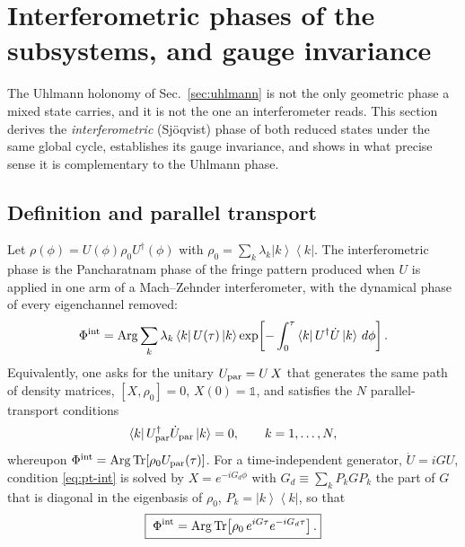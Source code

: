 \documentclass[11pt]{article}
\newcommand{\ket}[1]{\left|#1\right\rangle}
\newcommand{\bra}[1]{\left\langle#1\right|}
\newcommand{\Tr}{\operatorname{Tr}}
\newcommand{\Arg}{\operatorname{Arg}}
\begin{document}
\section{Interferometric phases of the subsystems, and gauge invariance}
\label{sec:interf}

The Uhlmann holonomy of Sec.~\ref{sec:uhlmann} is not the only geometric phase
a mixed state carries, and it is not the one an interferometer reads. This
section derives the \emph{interferometric} (Sj\"oqvist) phase
\cite{Sjoqvist2000} of both reduced states under the same global cycle,
establishes its gauge invariance, and shows in what precise sense it is
complementary to the Uhlmann phase.

\subsection{Definition and parallel transport}

Let $\rho(\phi)=U(\phi)\rho_0U^\dagger(\phi)$ with
$\rho_0=\sum_k\lambda_k\ket{k}\bra{k}$. The interferometric phase is the
Pancharatnam phase of the fringe pattern produced when $U$ is applied in one
arm of a Mach--Zehnder interferometer, with the dynamical phase of every
eigenchannel removed:
\begin{equation}
\Phi^{\rm int}=\Arg\sum_k\lambda_k\bra{k}U(\tau)\ket{k}
\exp\!\left[-\int_0^\tau\bra{k}U^\dagger\dot U\ket{k}\,d\phi\right].
\label{eq:sjoqvist}
\end{equation}
Equivalently, one asks for the unitary $U_{\rm par}=U\,X$ that generates the
same path of density matrices, $[X,\rho_0]=0$, $X(0)=\mathbb 1$, and satisfies
the $N$ parallel-transport conditions
\begin{equation}
\bra{k}U_{\rm par}^\dagger\dot U_{\rm par}\ket{k}=0,\qquad k=1,\dots,N ,
\label{eq:pt-int}
\end{equation}
whereupon $\Phi^{\rm int}=\Arg\Tr[\rho_0U_{\rm par}(\tau)]$. For a
time-independent generator, $\dot U=iGU$, condition \eqref{eq:pt-int} is solved
by $X=e^{-iG_d\phi}$ with $G_d\equiv\sum_kP_kGP_k$ the part of $G$ that is
diagonal in the eigenbasis of $\rho_0$, $P_k=\ket{k}\bra{k}$, so that
\begin{equation}
\boxed{\;\Phi^{\rm int}=\Arg\Tr\!\left[\rho_0\,e^{iG\tau}e^{-iG_d\tau}\right].}
\label{eq:int-holonomy}
\end{equation}
\end{document}
